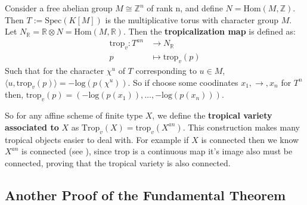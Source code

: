     Consider a free abelian group $M \cong \mathbb{Z}^n$ of rank n, and define $N = \text{Hom}(M,\mathbb{Z})$. 
    Then $T:= \text{Spec}(K[M])$ is the multiplicative torus with character group $M$. 
    Let $N_{\mathbb{R}} = \mathbb{R} \otimes N = \text{Hom}(M,\mathbb{R})$. Then the \textbf{tropicalization map} is defined as:
    \begin{align*}
        \text{trop}_v:T^{an} &\to N_{\mathbb{R}}\\
        p &\mapsto \text{trop}_v(p)
    \end{align*}
    Such that for the character $\chi^u$ of $T$ corresponding to $u \in M$, $\langle u,\text{trop}_{v}(p)\rangle = -\text{log}(p(\chi^{u}))$. So if choose some coodinates $x_1, \to, x_n$ for $T^{n}$ then, $\text{trop}_v(p) = (-\text{log}(p(x_1)), \dots,\allowbreak -\text{log}(p(x_n)))$.
    \par So for any affine scheme of finite type $X$, we define the \textbf{tropical variety associated to }$X$ as $\text{Trop}_v(X) = \text{trop}_v(X^{an})$. 
    This construction makes many tropical objects easier to deal with. 
    For example if $X$ is connected then we know $X^{an}$ is connected (see \cite{berkovich2012spectral}), since $\text{trop}$ is a continuous map it's image also must be connected, proving that the tropical variety is also connected.
\subsection{Another Proof of the Fundamental Theorem}
